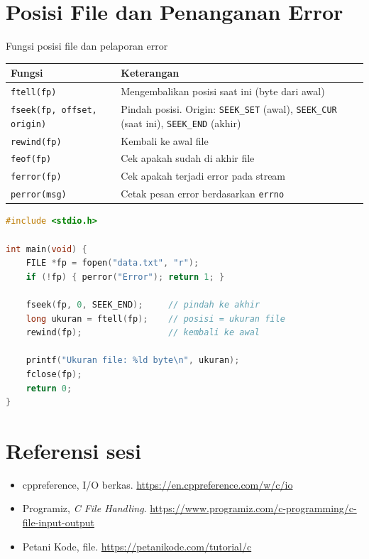 \documentclass[../main.tex]{subfiles}
\begin{document}
\section{Posisi File dan Penanganan Error}

\begin{modultable}[]{Fungsi posisi file dan pelaporan error}
\begin{tabular}{|l|p{8cm}|}
\hline
\textbf{Fungsi} & \textbf{Keterangan} \\
\hline
\texttt{ftell(fp)} & Mengembalikan posisi saat ini (byte dari awal) \\
\hline
\texttt{fseek(fp, offset, origin)} & Pindah posisi. Origin: \texttt{SEEK\_SET} (awal), \texttt{SEEK\_CUR} (saat ini), \texttt{SEEK\_END} (akhir) \\
\hline
\texttt{rewind(fp)} & Kembali ke awal file \\
\hline
\texttt{feof(fp)} & Cek apakah sudah di akhir file \\
\hline
\texttt{ferror(fp)} & Cek apakah terjadi error pada stream \\
\hline
\texttt{perror(msg)} & Cetak pesan error berdasarkan \texttt{errno} \\
\hline
\end{tabular}
\end{modultable}

\begin{lstlisting}[language=C,caption=Menghitung ukuran file dengan \texttt{fseek}/\texttt{ftell}]
#include <stdio.h>

int main(void) {
    FILE *fp = fopen("data.txt", "r");
    if (!fp) { perror("Error"); return 1; }
    
    fseek(fp, 0, SEEK_END);     // pindah ke akhir
    long ukuran = ftell(fp);    // posisi = ukuran file
    rewind(fp);                 // kembali ke awal
    
    printf("Ukuran file: %ld byte\n", ukuran);
    fclose(fp);
    return 0;
}
\end{lstlisting}

\section{Referensi sesi}
\begin{itemize}[leftmargin=*]
  \item cppreference, I/O berkas. \url{https://en.cppreference.com/w/c/io}
  \item Programiz, \textit{C File Handling}. \url{https://www.programiz.com/c-programming/c-file-input-output}
  \item Petani Kode, file. \url{https://petanikode.com/tutorial/c}
\end{itemize}
\end{document}
